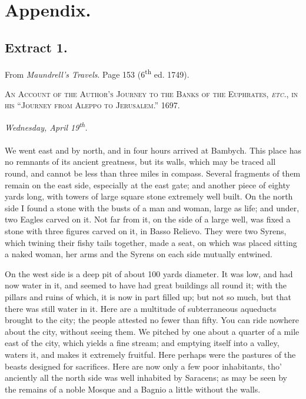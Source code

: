 \documentclass[a4paper, 11pt, oneside, polutonikogreek, english]{article}
\begin{document}
\clearpage
\section{Appendix.}
\subsection{Extract 1.}
\begin{center}
From \emph{Maundrell's Travels}. Page 153 (6\textsuperscript{th} ed. 1749).

\textsc{An Account of the Author's Journey to the Banks of the Euphrates, \emph{etc.}, in his ``Journey from Aleppo to Jerusalem.'' 1697.}

\emph{Wednesday, April 19\textsuperscript{th}.}
\end{center}
\paragraph{}
We went east and by north, and in four hours arrived at Bambych. This place has no remnants of its ancient greatness, but its walls, which may be traced all round, and cannot be less than three miles in compass. Several fragments of them remain on the east side, especially at the east gate; and another piece of eighty yards long, with towers of large square stone extremely well built. On the north side I found a stone with the busts of a man and woman, large as life; and under, two Eagles carved on it. Not far from it, on the side of a large well, was fixed a stone with three figures carved on it, in Basso Relievo. They were two Syrens, which twining their fishy tails together, made a seat, on which was placed sitting a naked woman, her arms and the Syrens on each side mutually entwined.

On the west side is a deep pit of about 100 yards diameter. It was low, and had now water in it, and seemed to have had great buildings all round it; with the pillars and ruins of which, it is now in part filled up; but not so much, but that there was still water in it. Here are a multitude of subterraneous aqueducts brought to the city; the people attested no fewer than fifty. You can ride nowhere about the city, without seeing them. We pitched by one about a quarter of a mile east of the city, which yields a fine stream; and emptying itself into a valley, waters it, and makes it extremely fruitful. Here perhaps were the pastures of the beasts designed for sacrifices. Here are now only a few poor inhabitants, tho' anciently all the north side was well inhabited by Saracens; as may be seen by the remains of a noble Mosque and a Bagnio a little without the walls.
\clearpage
\end{document}
